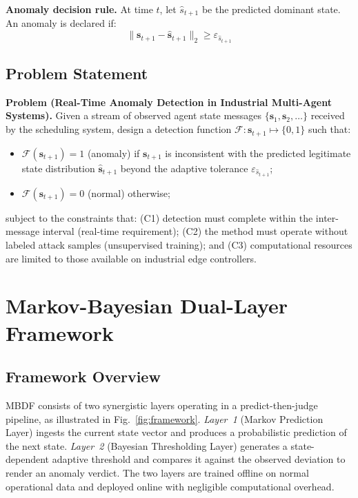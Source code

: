\documentclass[manuscript,screen,review]{acmart}
\begin{document}
\textbf{Anomaly decision rule.}
At time $t$, let $\hat{s}_{t+1}$ be the
predicted dominant state. An anomaly is declared if:
\begin{equation}
\|\mathbf{s}_{t+1} - \hat{\mathbf{s}}_{t+1}\|_2
\geq \varepsilon_{\hat{s}_{t+1}}
\label{eq:decision}
\end{equation}

\subsection{Problem Statement}
\label{subsec:problem_statement}

\textbf{Problem (Real-Time Anomaly Detection in Industrial
Multi-Agent Systems).}
Given a stream of observed agent state messages
$\{\mathbf{s}_1, \mathbf{s}_2, \ldots\}$ received by the
scheduling system, design a detection function
$\mathcal{F}: \mathbf{s}_{t+1} \mapsto \{0,1\}$ such that:
\begin{itemize}
  \item $\mathcal{F}(\mathbf{s}_{t+1}) = 1$ (anomaly) if
  $\mathbf{s}_{t+1}$ is inconsistent with the predicted
  legitimate state distribution $\hat{\mathbf{s}}_{t+1}$
  beyond the adaptive tolerance $\varepsilon_{\hat{s}_{t+1}}$;
  \item $\mathcal{F}(\mathbf{s}_{t+1}) = 0$ (normal) otherwise;
\end{itemize}
subject to the constraints that: (C1) detection must complete
within the inter-message interval (real-time requirement);
(C2) the method must operate without labeled attack samples
(unsupervised training); and (C3) computational resources
are limited to those available on industrial edge controllers.

\section{Markov-Bayesian Dual-Layer Framework}
\label{sec:framework}

\subsection{Framework Overview}
\label{subsec:overview}

MBDF consists of two synergistic layers operating in a
predict-then-judge pipeline, as illustrated in
Fig.~\ref{fig:framework}. \textit{Layer~1} (Markov Prediction
Layer) ingests the current state vector and produces a
probabilistic prediction of the next state. \textit{Layer~2}
(Bayesian Thresholding Layer) generates a state-dependent
adaptive threshold and compares it against the observed
deviation to render an anomaly verdict. The two layers are
trained offline on normal operational data and deployed
online with negligible computational overhead.
\end{document}
